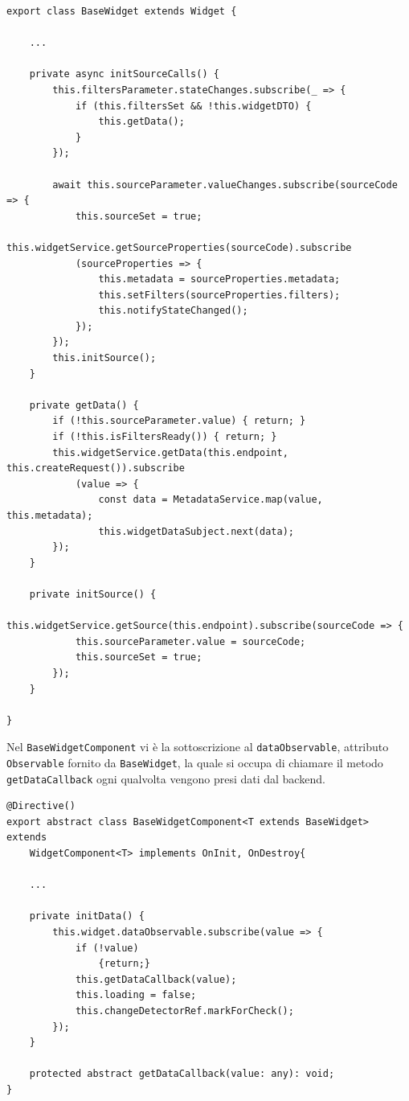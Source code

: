\begin{lstlisting}[caption={Inizializzazione dei parametri all'interno della classe BaseWidget}, style=javaScriptCode]
export class BaseWidget extends Widget {
    
    ...
    
    private async initSourceCalls() {
        this.filtersParameter.stateChanges.subscribe(_ => {
            if (this.filtersSet && !this.widgetDTO) {
                this.getData();
            }
        });

        await this.sourceParameter.valueChanges.subscribe(sourceCode => {
            this.sourceSet = true;
            this.widgetService.getSourceProperties(sourceCode).subscribe
            (sourceProperties => {
                this.metadata = sourceProperties.metadata;
                this.setFilters(sourceProperties.filters);
                this.notifyStateChanged();
            });
        });
        this.initSource();
    }

    private getData() {
        if (!this.sourceParameter.value) { return; }
        if (!this.isFiltersReady()) { return; }
        this.widgetService.getData(this.endpoint, this.createRequest()).subscribe
            (value => {
                const data = MetadataService.map(value, this.metadata);
                this.widgetDataSubject.next(data);
        });
    }

    private initSource() {
        this.widgetService.getSource(this.endpoint).subscribe(sourceCode => {
            this.sourceParameter.value = sourceCode;
            this.sourceSet = true;
        });
    }

}
\end{lstlisting}
Nel \verb|BaseWidgetComponent| vi è la sottoscrizione al \verb|dataObservable|, attributo \verb|Observable| fornito da \verb|BaseWidget|, la quale si occupa di chiamare il metodo \verb|getDataCallback| ogni qualvolta vengono presi dati dal backend.
\begin{lstlisting}[caption={Metodi per l'inizializzazione dei dati all'interno della classe BaseWidgetComponent}, style=javaScriptCode]
@Directive()
export abstract class BaseWidgetComponent<T extends BaseWidget> extends 
    WidgetComponent<T> implements OnInit, OnDestroy{

    ...
        
    private initData() {
        this.widget.dataObservable.subscribe(value => {
            if (!value)
                {return;}
            this.getDataCallback(value);
            this.loading = false;
            this.changeDetectorRef.markForCheck();
        });
    }

    protected abstract getDataCallback(value: any): void;
}
\end{lstlisting}

